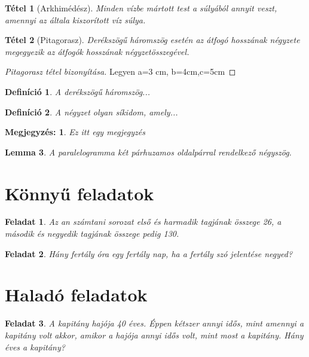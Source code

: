 \documentclass{article}
\newtheorem{tet}{Tétel}
\newtheorem{defin}{Definíció}
\newtheorem{lemma}[tet]{Lemma}
\newtheorem{feladat}{Feladat}[section]
\newtheorem*{megj}{Megjegyzés:}
\begin{document}
\tableofcontents


\begin{tet}[Arkhimédész]
Minden vízbe mártott test a súlyából annyit veszt, amennyi az általa kiszorított víz súlya.
\end{tet}

\begin{tet}[Pitagorasz]
Derékszögű háromszög esetén az átfogó hosszának négyzete megegyezik az átfogók hosszának négyzetösszegével.
\end{tet}

\begin{proof}[Pitagorasz tétel bizonyítása]
Legyen a=3 cm, b=4cm,c=5cm
\end{proof}

\begin{defin}
A derékszögű háromszög...
\end{defin}


\begin{defin}
A négyzet olyan síkidom, amely...
\end{defin}

\begin{megj}
Ez itt egy megjegyzés
\end{megj}

\begin{lemma}
A paralelogramma két párhuzamos oldalpárral rendelkező négyszög.
\end{lemma}

\section{Könnyű feladatok}
\begin{feladat}
Az {an} számtani sorozat első és harmadik tagjának összege 26, a második és negyedik 
tagjának összege pedig 130.
\end{feladat}

\begin{feladat}
Hány fertály óra egy fertály nap, ha a fertály szó jelentése negyed?
\end{feladat}

\section{Haladó feladatok}
\begin{feladat}
A kapitány hajója 40 éves. Éppen kétszer annyi idős, mint amennyi a kapitány volt akkor, amikor a hajója annyi idős volt, mint most a kapitány. Hány éves a kapitány? 
\end{feladat}
\end{document}
